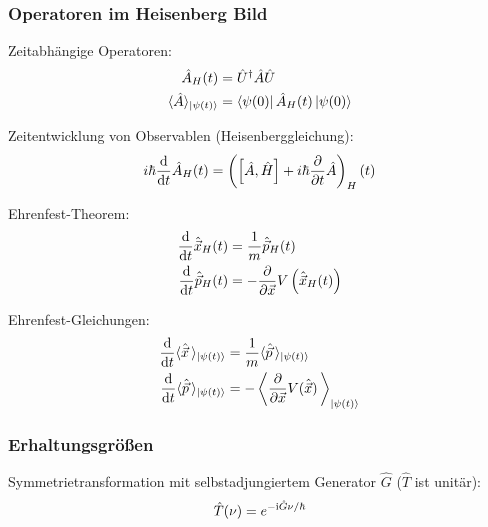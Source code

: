 \documentclass[11pt]{article}
\numberwithin{equation}{section}
\begin{document}
			\subsubsection{Operatoren im Heisenberg Bild}
				\noindent
				Zeitabhängige Operatoren:
				\begin{equation}
					\begin{aligned}
						\hat{A}_H(t) &= \hat{U}^\dagger \hat{A} \hat{U} \\
						\langle \hat{A} \rangle_{\Ket{\psi(t)}} &= \Bra{\psi(0)}\hat{A}_H(t)\Ket{\psi(0)}
					\end{aligned}
				\end{equation}

				\noindent
				Zeitentwicklung von Observablen (Heisenberggleichung):
				\begin{equation}
					i\hbar \frac{\mathrm{d} }{\mathrm{d} t} \hat{A}_H(t) = \left(\left[\hat{A}, \hat{H}\right] + i\hbar \frac{\partial }{\partial t} \hat{A}\right)_H (t)
				\end{equation}

				\noindent
				Ehrenfest-Theorem:
				\begin{equation}
					\begin{aligned}
						\frac{\mathrm{d} }{\mathrm{d} t} \hat{\vec{x}}_H(t) &= \frac{1}{m}\hat{\vec{p}}_H(t) \\
						\frac{\mathrm{d} }{\mathrm{d} t} \hat{\vec{p}}_H(t) &= - \frac{\partial }{\partial \vec{x}} V \left(\hat{\vec{x}}_H(t)\right) \\
					\end{aligned}
				\end{equation}

				\noindent
				Ehrenfest-Gleichungen:
				\begin{equation}
					\begin{aligned}
						\frac{\mathrm{d} }{\mathrm{d} t} \langle \hat{\vec{x}} \,\rangle_{\Ket{\psi(t)}} &= \frac{1}{m} \langle \hat{\vec{p}} \,\rangle_{\Ket{\psi(t)}} \\
						\frac{\mathrm{d} }{\mathrm{d} t} \langle \hat{\vec{p}} \,\rangle_{\Ket{\psi(t)}} &= - \left\langle \frac{\partial }{\partial \vec{x}} V(\hat{\vec{x}}) \,\right\rangle_{\Ket{\psi(t)}} \\
					\end{aligned}
				\end{equation}

			\subsubsection{Erhaltungsgrößen}
				\noindent
				Symmetrietransformation mit selbstadjungiertem Generator $\hat{G}$ ($\hat{T}$ ist unitär):
				\begin{equation}
					\hat{T}(\nu) = e^{-\mathrm{i}\hat{G}\nu/\hbar}
				\end{equation}
\end{document}
